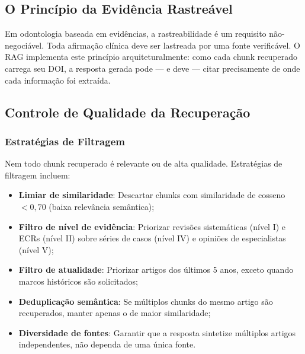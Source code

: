 \subsection{O Princípio da Evidência Rastreável}

Em odontologia baseada em evidências, a rastreabilidade é um requisito não-negociável. Toda afirmação clínica deve ser lastreada por uma fonte verificável. O RAG implementa este princípio arquiteturalmente: como cada chunk recuperado carrega seu DOI, a resposta gerada pode --- e deve --- citar precisamente de onde cada informação foi extraída.


\subsection{Controle de Qualidade da Recuperação}

\subsubsection{Estratégias de Filtragem}

Nem todo chunk recuperado é relevante ou de alta qualidade. Estratégias de filtragem incluem:
\begin{itemize}
    \item \textbf{Limiar de similaridade}: Descartar chunks com similaridade de cosseno $< 0,70$ (baixa relevância semântica);
    \item \textbf{Filtro de nível de evidência}: Priorizar revisões sistemáticas (nível I) e ECRs (nível II) sobre séries de casos (nível IV) e opiniões de especialistas (nível V);
    \item \textbf{Filtro de atualidade}: Priorizar artigos dos últimos 5 anos, exceto quando marcos históricos são solicitados;
    \item \textbf{Deduplicação semântica}: Se múltiplos chunks do mesmo artigo são recuperados, manter apenas o de maior similaridade;
    \item \textbf{Diversidade de fontes}: Garantir que a resposta sintetize múltiplos artigos independentes, não dependa de uma única fonte.
\end{itemize}

